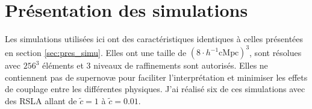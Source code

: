 %
%
%
%
%
%
%
%
%
%


\section{Présentation des simulations}

Les simulations utilisées ici ont des caractéristiques identiques à celles présentées en section \ref{sec:pres_simu}.
Elles ont une taille de $\left( 8 \cdot h^{-1} \mathrm{cMpc } \right)^3$, sont résolues avec $256^3$ éléments et 3 niveaux de raffinements sont autorisés.
Elles ne contiennent pas de supernovæ pour faciliter l'interprétation et minimiser les effets de couplage entre les différentes physiques.
J'ai réalisé six de ces simulations avec des \ac{RSLA} allant de $\tilde{c}=1$ à $\tilde{c}=0.01$.

